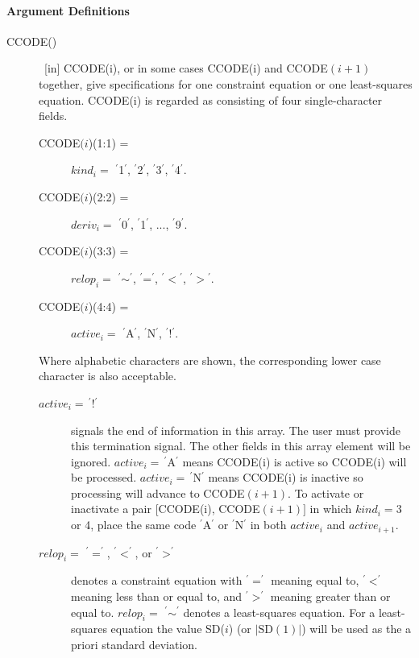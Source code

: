 \documentclass[twoside]{MATH77}
\begin{document}
\paragraph{Argument Definitions}
\begin{description}
\item[CCODE()]  \ [in] CCODE(i), or in some cases CCODE(i) and
CCODE$(i+1)$ together, give specifications for one constraint equation or
one least-squares equation. CCODE(i) is regarded as consisting of four
single-character fields.
\begin{description}
\item[\rm CCODE$(i$)(1:1) =]  $kind_i=$ $^{\prime}$1$^{\prime}$, $%
^{\prime}$2$^{\prime}$, $^{\prime}$3$^{\prime}$, $^{\prime}$4$^{\prime}$.

\item[\rm CCODE$(i$)(2:2) =]  $deriv_i=$ $^{\prime}$0$^{\prime}$, $%
^{\prime}$1$^{\prime}$, ..., $^{\prime}$9$^{\prime}$.

\item[\rm CCODE$(i$)(3:3) =]  $relop_i=$ $^{\prime}${$\sim $}$^{\prime}$, $%
^{\prime }$=$^{\prime }$, $%
^{\prime }${$<$}$^{\prime }$, $^{\prime }${$>$}$^{\prime }.$

\item[\rm CCODE$(i$)(4:4) =]  $active_i=$ $^{\prime}$A$^{\prime}$, $%
^{\prime }$N$^{\prime }$, $^{\prime}$!$^{\prime}$.
\end{description}
Where alphabetic characters are shown, the corresponding lower case
character is also acceptable.
\begin{description}
\item[\rm $active_i =\,^{\prime}$!$^{\prime}$]  signals the end of information
in this array. The user must provide this termination signal. The other
fields in this array element will be ignored. $active_i=\,^{\prime }$A$^{\prime
} $ means CCODE(i) is active so CCODE(i) will be processed. $%
active_i=\,^{\prime }$N$^{\prime }$ means CCODE(i) is inactive so processing
will advance to CCODE$(i+1)$. To activate or inactivate a pair [CCODE(i),
CCODE$(i+1)]$ in which $kind_i=3$ or 4, place the same
code $^{\prime }$A$^{\prime}$ or $^{\prime }$N$^{\prime }$ in
both $active_i$ and $active_{i+1}.$

\item[\rm $relop_i =$ $^{\prime}{=}^{\prime}$, $^{\prime}{<}^{\prime}$,
or $^{\prime}{>}^{\prime}$]  denotes a constraint equation
with $^{\prime }{=}^{\prime }$ meaning equal
to, $^{\prime }{<}^{\prime }$ meaning less than or equal to, and $^{\prime
}{>}^{\prime }$ meaning greater than or equal to. $relop_i=$ $^{\prime
}{\sim }^{\prime }$ denotes a least-squares equation. For a least-squares
equation the value SD($i$) (or $|\text{SD}(1)|$) will be used as the a
priori standard deviation.


\end{description}
\end{description}
\end{document}
